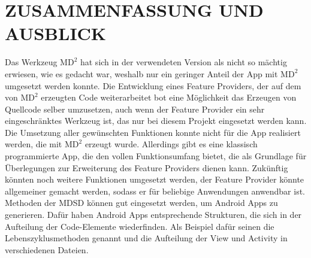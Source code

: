 \section{\uppercase{Zusammenfassung und Ausblick}}
\noindent Das Werkzeug $\text{MD}^2$ hat sich in der verwendeten Version als nicht so m\"achtig erwiesen, wie es gedacht war, weshalb nur ein geringer Anteil der App mit $\text{MD}^2$ umgesetzt werden konnte. Die Entwicklung eines Feature Providers, der auf dem von $\text{MD}^2$ erzeugten Code weiterarbeitet bot eine M\"oglichkeit das Erzeugen von Quellcode selber umzusetzen, auch wenn der Feature Provider ein sehr eingeschr\"anktes Werkzeug ist, das nur bei diesem Projekt eingesetzt werden kann. Die Umsetzung aller gew\"unschten Funktionen konnte nicht f\"ur die App realisiert werden, die mit $\text{MD}^2$ erzeugt wurde. Allerdings gibt es eine klassisch programmierte App, die den vollen Funktionsumfang bietet, die als Grundlage f\"ur \"Uberlegungen zur Erweiterung des Feature Providers dienen kann. Zuk\"unftig k\"onnten noch weitere Funktionen umgesetzt werden, der Feature Provider k\"onnte allgemeiner gemacht werden, sodass er f\"ur beliebige Anwendungen anwendbar ist.\\
Methoden der MDSD k\"onnen gut eingesetzt werden, um Android Apps zu generieren. Daf\"ur haben Android Apps entsprechende Strukturen, die sich in der Aufteilung der Code-Elemente wiederfinden. Als Beispiel daf\"ur seinen die Lebenszyklusmethoden genannt und die Aufteilung der View und Activity in verschiedenen Dateien.